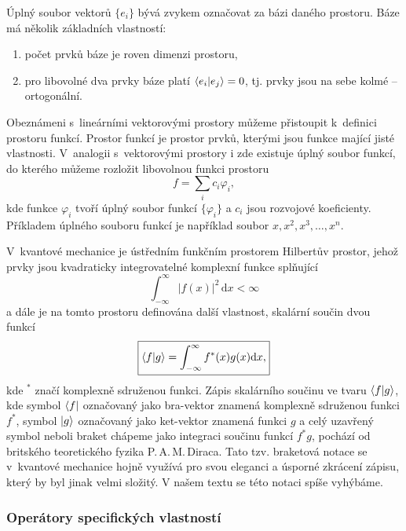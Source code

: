 Úplný soubor vektorů $\{e_i\}$ bývá zvykem označovat za bázi daného prostoru. Báze má několik základních vlastností:
\begin{enumerate}
\item počet prvků báze je roven dimenzi prostoru,
\item pro libovolné dva prvky báze platí $\braket{e_i|e_j} = 0$, tj. prvky jsou na sebe kolmé -- ortogonální.
\end{enumerate}

Obeznámeni s~lineárními vektorovými prostory můžeme přistoupit k~definici prostoru funkcí. Prostor funkcí je prostor prvků, kterými jsou funkce mající jisté vlastnosti. V~analogii s~vektorovými prostory i zde existuje úplný soubor funkcí, do kterého můžeme rozložit libovolnou funkci prostoru
\begin{equation}
f = \sum_i c_i \varphi_i,
\label{rov:RozvojDoBazeFunkci}
\end{equation}
kde funkce $\varphi_i$ tvoří úplný soubor funkcí $\{\varphi_i\}$ a $c_i$ jsou rozvojové koeficienty. Příkladem úplného souboru funkcí je například soubor $x, x^2, x^3, \dots, x^n$.

V~kvantové mechanice je ústředním funkčním prostorem Hilbertův prostor, jehož prvky jsou kvadraticky integrovatelné komplexní funkce  splňující
\begin{equation}
\boxed{\int_{-\infty}^{\infty} |f(x)|^2 \,\mathrm{d}x < \infty}
\label{rov:KvandarickaIntegrovatelnost}
\end{equation} 
a dále je na tomto prostoru definována další vlastnost, skalární součin dvou funkcí
\begin{equation}
\boxed{\braket{f|g} = \int_{-\infty}^{\infty} f^{\ast}(x) g(x) \mathrm{d}x,}
\label{rov:SkalarniSoucinFci}
\end{equation}
kde $^{\ast}$ značí komplexně sdruženou funkci. Zápis skalárního součinu ve tvaru $\braket{f|g}$, kde symbol $\bra{f}$ označovaný jako bra-vektor znamená komplexně sdruženou funkci $f^{\ast}$, symbol $\ket{g}$ označovaný jako ket-vektor znamená funkci $g$ a celý uzavřený symbol neboli braket chápeme jako integraci součinu funkcí $f^{\ast}g$, pochází od britského teoretického fyzika P.\,A.\,M.\,Diraca. Tato tzv. braketová notace se v~kvantové mechanice hojně využívá pro svou eleganci a úsporné zkrácení zápisu, který by byl jinak velmi složitý. V našem textu se této notaci spíše vyhýbáme.



\subsubsection{Operátory specifických vlastností}
\label{kap:OperatorySpecifickychVlastnosti}

